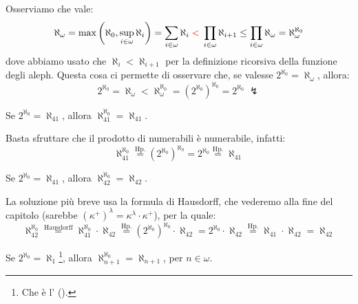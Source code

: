 \begin{example}
	Osserviamo che vale:
	\[ \aleph_\omega = \max\left(\aleph_0, \sup_{i \in \omega} \aleph_i\right) = \sum_{i \in \omega} \aleph_i \;\textcolor{red}{<}\; \prod_{i \in \omega} \aleph_{i + 1} \leq \prod_{i \in \omega} \aleph_\omega = \aleph_\omega^{\aleph_0}
		\]
	dove abbiamo usato che $\aleph_i < \aleph_{i + 1}$ per la definizione ricorsiva della funzione degli aleph. Questa cosa ci permette di osservare che, se valesse $2^{\aleph_0} = \aleph_\omega$, allora:
	\[ 2^{\aleph_0} = \aleph_\omega < \aleph_\omega^{\aleph_0} = (2^{\aleph_0})^{\aleph_0} = 2^{\aleph_0} \; \lightning
		\]
\end{example}

\begin{exercise}[Facile]
	Se $2^{\aleph_0} = \aleph_{41}$, allora $\aleph_{41}^{\aleph_0} = \aleph_{41}$.
\end{exercise}

\begin{soln}
	Basta sfruttare che il prodotto di numerabili \`e numerabile, infatti:
	\[ \aleph_{41}^{\aleph_0} \overset{\text{Hp.}}{=} (2^{\aleph_0})^{\aleph_0} = 2^{\aleph_0} \overset{\text{Hp.}}{=} \aleph_{41}
		\]
\end{soln}

\begin{exercise}[Difficile]
	Se $2^{\aleph_0} = \aleph_{41}$, allora $\aleph_{42}^{\aleph_0} = \aleph_{42}$.
\end{exercise}

\begin{soln}
	La soluzione pi\`u breve usa la formula di Hausdorff, che vederemo alla fine del capitolo (sarebbe $(\kappa^+)^{\lambda} = \kappa^{\lambda} \cdot \kappa^+$), per la quale:
	\[ \aleph_{42}^{\aleph_0} \overset{\text{Hausdorff}}{=} \aleph_{41}^{\aleph_0} \cdot \aleph_{42} \overset{\text{Hp.}}{=} (2^{\aleph_0})^{\aleph_0} \cdot \aleph_{42} = 2^{\aleph_0} \cdot \aleph_{42} \overset{\text{Hp.}}{=} \aleph_{41} \cdot \aleph_{42} = \aleph_{42}
		\]
\end{soln}

\begin{exercise}
	Se $2^{\aleph_0} = \aleph_{1}$\footnote{Che \`e l' ().}, allora $\aleph_{n+1}^{\aleph_0} = \aleph_{n+1}$, per $n \in \omega$.
\end{exercise}


